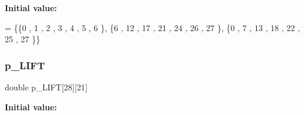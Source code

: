{\bfseries Initial value\+:}
\begin{DoxyCode}
= \{\{0 , 1 , 2 , 3 , 4 , 5 , 6 \},
\{6 , 12 , 17 , 21 , 24 , 26 , 27 \},
\{0 , 7 , 13 , 18 , 22 , 25 , 27 \}\}
\end{DoxyCode}
\mbox{\label{a00521_a21d80bf79d58fbc86b7f27d5c4a7e305}} 
\subsubsection{\texorpdfstring{p\+\_\+\+L\+I\+FT}{p\_LIFT}}
{\footnotesize\ttfamily double p\+\_\+\+L\+I\+FT\mbox{[}28\mbox{]}\mbox{[}21\mbox{]}}

{\bfseries Initial value\+:}
